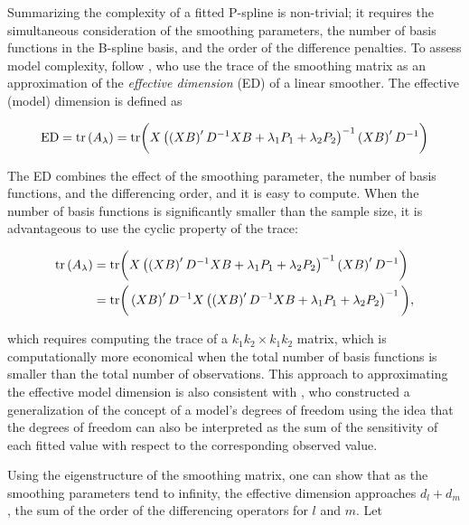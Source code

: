 \bigskip

Summarizing the complexity of a fitted P-spline is non-trivial; it requires the simultaneous consideration of the smoothing parameters, the number of basis functions in the B-spline basis, and the order of the difference penalties. To assess model complexity, \cite{eilers1996flexible} follow \cite{hastie1990generalized}, who use the trace of the smoothing matrix as an approximation of the \textit{effective dimension} (ED) of a linear smoother. The effective (model) dimension is defined as 

\begin{equation} \label{eq:trace-of-the-smoothing-matrix}
\textup{ED} = \textup{tr}\left( A_\lambda \right) = \textup{tr}\bigg( X\left( \left(XB\right)^\prime D^{-1}XB +  \lambda_1 P_1+ \lambda_2 P_2\right)^{-1} \left(X B\right)^\prime D^{-1}  \bigg)
\end{equation}

\noindent
The ED combines the effect of the smoothing parameter, the number of basis functions, and the differencing order, and it is easy to compute. When the number of basis functions is significantly smaller than the sample size, it is advantageous to use the cyclic property of the trace: 

\begin{align*}
\textup{tr}\left( A_\lambda \right) &= \textup{tr}\bigg( X\left( \left(XB\right)^\prime D^{-1}XB +  \lambda_1 P_1+ \lambda_2 P_2\right)^{-1} \left(X B\right)^\prime D^{-1}  \bigg)\\
&= \textup{tr}\bigg( \left(X B\right)^\prime D^{-1}  X\left( \left(XB\right)^\prime D^{-1}XB +  \lambda_1 P_1+ \lambda_2 P_2\right)^{-1} \bigg),
\end{align*}

\noindent
which requires computing the trace of a $k_1k_2 \times k_1k_2$ matrix, which is computationally more economical when the total number of basis functions is smaller than the total number of observations. This approach to approximating the effective model dimension is also consistent with \cite{ye1998measuring}, who constructed a generalization of the concept of a model's degrees of freedom using the idea that the degrees of freedom can also be interpreted as the sum of the sensitivity of each fitted value with respect to the corresponding observed value.

\bigskip

Using the eigenstructure of the smoothing matrix, one can show that as the smoothing parameters tend to infinity, the effective dimension approaches $d_l + d_m$, the sum of the order of the differencing operators for $l$ and $m$. Let

